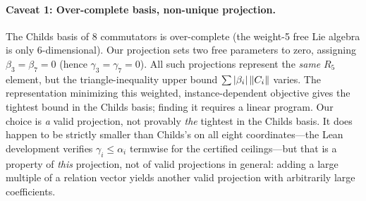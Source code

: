 \paragraph{Caveat 1: Over-complete basis, non-unique projection.}
The Childs basis of 8 commutators is over-complete (the weight-5 free Lie
algebra is only 6-dimensional). Our projection sets two free parameters to
zero, assigning $\beta_3 = \beta_7 = 0$ (hence $\gamma_3 = \gamma_7 = 0$).
All such projections represent
the \emph{same} $R_5$ element, but the triangle-inequality upper bound
$\sum \left|\beta_i\right| \left\|C_i\right\|$ varies. The representation minimizing this
weighted, instance-dependent objective
gives the tightest bound in the Childs basis; finding it requires a linear
program. Our choice is \emph{a} valid projection, not provably \emph{the}
tightest in the Childs basis. It does happen to be strictly smaller than
Childs's on all eight coordinates---the Lean development verifies
$\gamma_i \le \alpha_i$ termwise for the certified ceilings---but that is a property of
\emph{this} projection, not of valid projections in general: adding a large
multiple of a relation vector yields another valid projection with
arbitrarily large coefficients.

